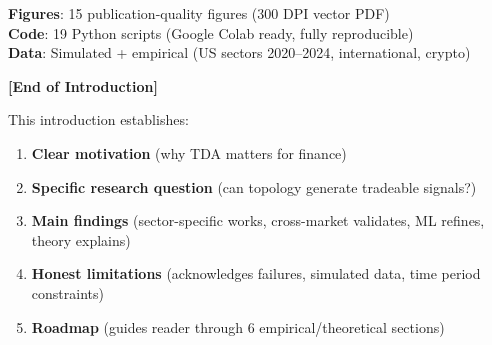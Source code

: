 \textbf{Figures}: 15 publication-quality figures (300 DPI vector PDF) \\
\textbf{Code}: 19 Python scripts (Google Colab ready, fully reproducible) \\
\textbf{Data}: Simulated + empirical (US sectors 2020--2024, international, crypto)

\vspace{1em}

\textbf{[End of Introduction]}

\vspace{1em}

This introduction establishes:
\begin{enumerate}
\item \textbf{Clear motivation} (why TDA matters for finance)
\item \textbf{Specific research question} (can topology generate tradeable signals?)
\item \textbf{Main findings} (sector-specific works, cross-market validates, ML refines, theory explains)
\item \textbf{Honest limitations} (acknowledges failures, simulated data, time period constraints)
\item \textbf{Roadmap} (guides reader through 6 empirical/theoretical sections)
\end{enumerate}

